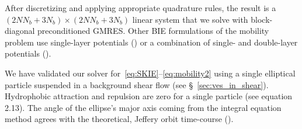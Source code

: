 \documentclass[lineno]{jfm}
\newcommand{\xx}{\mathbf{x}}
\newcommand{\uu}{\mathbf{u}}
\begin{document}
After discretizing and applying appropriate quadrature rules, the result
is a $(2NN_b + 3N_b) \times (2NN_b + 3N_b)$ linear system that we solve
with block-diagonal preconditioned GMRES. Other BIE formulations of the
mobility problem use single-layer potentials (\cite{cor-gre-rac-vee2017,
rac-gre2016}) or a combination of single- and double-layer potentials
(\cite{cor-vee2018}).

We have validated our solver for~\eqref{eq:SKIE}--\eqref{eq:mobility2}
using a single elliptical particle suspended in a background shear flow
(see \S~\ref{sec:ves_in_shear}). Hydrophobic attraction and repulsion
are zero for a single particle (see \cite{Fu20} equation 2.13). The
angle of the ellipse's major axis coming from the integral equation
method agrees with the theoretical, Jeffery orbit time-course
(\cite{jef1922}). 
  
% 


\end{document}
